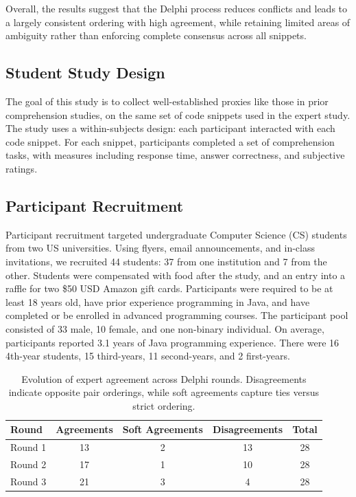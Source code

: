 Overall, the results suggest that the Delphi process reduces conflicts and leads to a largely consistent ordering with high agreement, while retaining limited areas of ambiguity rather than enforcing complete consensus across all snippets.

 
\subsection{Student Study Design}
\label{sec:student-study}

The goal of this study is to collect well-established proxies like those in prior comprehension studies, on the same set of code snippets used in the expert study. The study uses a within-subjects design: each participant interacted with each code snippet. For each snippet, participants completed a set of comprehension tasks, with measures including response time, answer correctness, and subjective ratings.

\subsection{Participant Recruitment}

Participant recruitment targeted undergraduate Computer Science (CS) students from two US universities. 
Using flyers, email announcements, and in-class invitations, we recruited 44 students: 37 from one institution and 7 from the other. 
Students were compensated with food after the study, and an entry into a raffle for two \$50 USD Amazon gift cards. Participants were required to be at least 18 years old, have prior experience programming in Java, and have completed or be enrolled in advanced programming courses. The participant pool consisted of 33 male, 10 female, and one non-binary individual. On average, participants reported 3.1 years of Java programming experience. There were 16 4th-year students, 15 third-years, 11 second-years, and 2 first-years.

\begin{table}[t]
\centering
\caption{Evolution of expert agreement across Delphi rounds. Disagreements indicate opposite pair orderings, while soft agreements capture ties versus strict ordering.}
\small
\setlength{\tabcolsep}{5pt}
\begin{tabular}{lcccc}
\toprule
\textbf{Round} & \textbf{Agreements} & \textbf{Soft Agreements} & \textbf{Disagreements} & \textbf{Total} \\
\midrule
Round 1 & 13 & 2 & 13 & 28 \\
Round 2 & 17 & 1 & 10 & 28 \\
Round 3 & 21 & 3 & 4  & 28 \\
\bottomrule
\end{tabular}
\label{tab:delphi_agreement}
\end{table}

